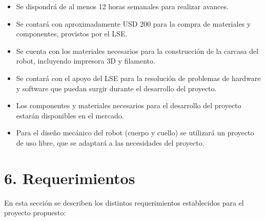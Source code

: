 \documentclass[
11pt, %
]{charter}
\begin{document}
\begin{itemize}
	\item Se dispondrá de al menos 12 horas semanales para realizar avances.
	\item Se contará con aproximadamente USD 200 para la compra de materiales y componentes, provistos por el LSE.
	\item Se cuenta con los materiales necesarios para la construcción de la carcasa del robot, incluyendo impresora 3D y filamento.
	\item Se contará con el apoyo del LSE para la resolución de problemas de hardware y software que puedan surgir durante el desarrollo del proyecto.
	\item Los componentes y materiales necesarios para el desarrollo del proyecto estarán disponibles en el mercado.
	\item Para el diseño mecánico del robot (cuerpo y cuello) se utilizará un proyecto de uso libre, que se adaptará a las necesidades del proyecto.
\end{itemize}

\section{6. Requerimientos}
\label{sec:requerimientos}

En esta sección se describen los distintos requerimientos establecidos para el proyecto propuesto:
\end{document}
